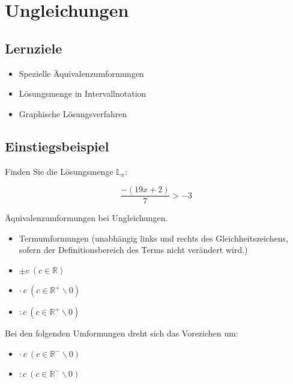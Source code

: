 
\section{Ungleichungen}


\subsection*{Lernziele}

\begin{itemize}
\item Spezielle Äquivalenzumformungen
\item Lösungsmenge in Intervallnotation
\item Graphische Lösungsverfahren
\end{itemize}


\subsection{Einstiegsbeispiel}
Finden Sie die Lösungsmenge $\mathbb{L}_x$:

$$\frac{-(19x+2)}{7} > -3$$


\TNT{8}{
  $\cdot{}7$
  $$-(19x+2) > -21$$
  $\cdot{}(-1)$
  $$19x+2 < 21$$
  $-2$
  $$19x<19$$
  $:19$
  $$x<1$$
  Lösungsmenge
  $$\mathbb{L}_x = ]\infty;1]$$
}%


  \newpage
  
\begin{gesetz}{}{}
  Äquivalenzumformungen bei Ungleichungen.

  \begin{itemize}
	\item Termumformungen (unabhängig links und rechts des Gleichheitszeichens, sofern der Definitionsbereich des Terms nicht verändert wird.)
	\item $\pm    c\ (c \in \mathbb{R})$
	\item $\cdot\ c\ (c \in \mathbb{R}^+\backslash 0)$
	\item $:      c\ (c \in \mathbb{R}^+\backslash 0)$
\end{itemize}

  Bei den folgenden Umformungen dreht sich das Vorezichen um:
\begin{itemize}
	\item $\cdot\ c\ (c \in \mathbb{R}^-\backslash 0)$
	\item $:      c\ (c \in \mathbb{R}^-\backslash 0)$
  \end{itemize}
  
  \end{gesetz}

